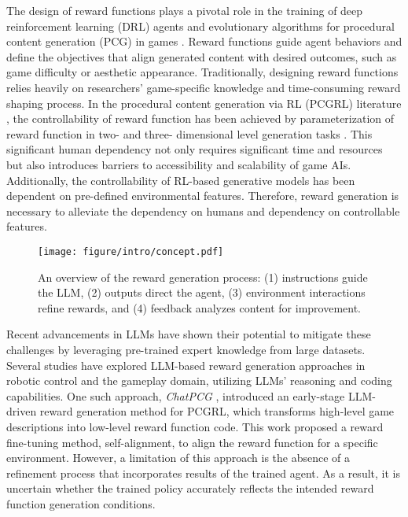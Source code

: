 The design of reward functions plays a pivotal role in the training of deep reinforcement learning (DRL) agents and evolutionary algorithms for procedural content generation (PCG) in games \cite{liu2021deep}. Reward functions guide agent behaviors and define the objectives that align generated content with desired outcomes, such as game difficulty or aesthetic appearance.
Traditionally, designing reward functions relies heavily on researchers' game-specific knowledge and time-consuming reward shaping process. 
In the procedural content generation via RL (PCGRL) literature \cite{khalifa2020pcgrl}, the controllability of reward function has been achieved by parameterization of reward function in two- and three- dimensional level generation tasks \cite{earle2021learning, jiang2022learning}.
This significant human dependency not only requires significant time and resources but also introduces barriers to accessibility and scalability of game AIs.
Additionally, the controllability of RL-based generative models has been dependent on pre-defined environmental features.
Therefore, reward generation is necessary to alleviate the dependency on humans and dependency on controllable features.

\begin{figure}[!t]
    \centering
    \texttt{[image: figure/intro/concept.pdf]}
    \caption{An overview of the reward generation process: (1) instructions guide the LLM, (2) outputs direct the agent, (3) environment interactions refine rewards, and (4) feedback analyzes content for improvement.}
    \label{fig:concept}
\end{figure}

Recent advancements in LLMs have shown their potential to mitigate these challenges by leveraging pre-trained expert knowledge from large datasets. Several studies have explored LLM-based reward generation approaches in robotic control \cite{ma2023eureka, zeng2023learning, yu2023language} and the gameplay \cite{li2024auto, zheng2024online} domain, utilizing LLMs' reasoning and coding capabilities.
One such approach, \textit{ChatPCG} \cite{baek2024chatpcg}, introduced an early-stage LLM-driven reward generation method for PCGRL, which transforms high-level game descriptions into low-level reward function code.
This work proposed a reward fine-tuning method, self-alignment, to align the reward function for a specific environment. However, a limitation of this approach is the absence of a refinement process that incorporates results of the trained agent. As a result, it is uncertain whether the trained policy accurately reflects the intended reward function generation conditions.

